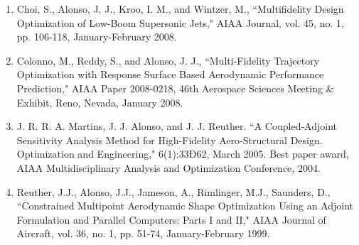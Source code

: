 \begin{enumerate}
\item Choi, S., Alonso, J. J., Kroo, I. M., and Wintzer, M., ``Multifidelity Design Optimization of Low-Boom Supersonic Jets," AIAA Journal, vol. 45, no. 1, pp. 106-118, January-February 2008.

\item Colonno, M., Reddy, S., and Alonso, J. J., ``Multi-Fidelity Trajectory Optimization with Response Surface Based Aerodynamic Performance Prediction," AIAA Paper 2008-0218, 46th Aerospace Sciences Meeting \& Exhibit, Reno, Nevada, January 2008.

\item J. R. R. A. Martins, J. J. Alonso, and J. J. Reuther. ``A Coupled-Adjoint Sensitivity Analysis Method for High-Fidelity Aero-Structural Design. Optimization and Engineering," 6(1):33Ð62, March 2005.  Best paper award, AIAA Multidisciplinary Analysis and Optimization Conference, 2004.

\item Reuther, J.J., Alonso, J.J., Jameson, A., Rimlinger, M.J., Saunders, D., ``Constrained Multipoint Aerodynamic Shape Optimization Using an Adjoint Formulation and Parallel Computers: Parts I and II," AIAA Journal of Aircraft, vol. 36, no. 1, pp. 51-74, January-February 1999.

\end{enumerate}
